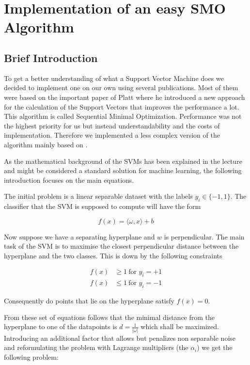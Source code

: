 \section{Implementation of an easy SMO Algorithm}
\subsection{Brief Introduction}
To get a better understanding of what a Support Vector Machine does we decided to implement one on our own using several publications. Most of them were based on the important paper of Platt \cite{platt} where he introduced a new approach for the calculation of the Support Vectors that improves the performance a lot. This algorithm is called Sequential Minimal Optimization. Performance was not the highest priority for us but instead understandability and the costs of implementation. Therefore we implemented a less complex version of the algorithm mainly based on \cite{smo}.

As the mathematical background of the SVMs has been explained in the lecture and might be considered a standard solution for machine learning, the following introduction focuses on the main equations.

The initial problem is a linear separable dataset with the labels $y_i \in \{-1, 1\}$. The classifier that the SVM is supposed to compute will have the form

\begin{equation}
    f(x) = \langle \omega, x \rangle + b
\end{equation}

Now suppose we have a separating hyperplane and $w$ is perpendicular. The main task of the SVM is to maximise the closest perpendicular distance between the hyperplane and the two classes. This is down by the following constraints

\begin{align}
f(x) &\geq 1\ \text{for $y_i = +1$} \\
f(x) &\leq 1\ \text{for $y_i = -1$}
\end{align}

Consequently do points that lie on the hyperplane satisfy $f(x)=0$.

From these set of equations follows that the minimal distance from the hyperplane to one of the datapoints is $d=\frac{1}{|\omega|}$ which shall be maximized. Introducing an additional factor that allows but penalizes non separable noise and reformulating the problem with Lagrange multipliers (the $\alpha _i$) we get the following problem:

